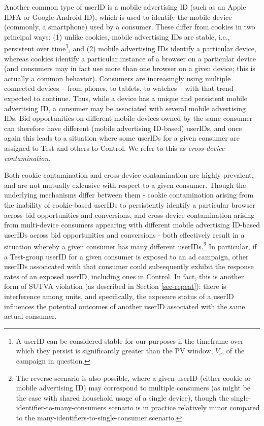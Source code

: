 \documentclass[11pt,a4paper]{article}
\theoremstyle{definition}
\theoremstyle{remark}
\theoremstyle{definition}
\theoremstyle{definition}
\theoremstyle{definition}
\theoremstyle{definition}
\theoremstyle{definition}
\theoremstyle{definition}
\begin{document}
Another common type of userID is a mobile advertising ID (such as an Apple IDFA or Google Android ID), which is used to identify the mobile device (commonly, a smartphone) used by a consumer. These differ from cookies in two principal ways: (1) unlike cookies, mobile advertising IDs are stable, i.e., persistent over time\footnote{A userID can be considered stable for our purposes if the timeframe over which they persist is significantly greater than the PV window, $V_c$, of the campaign in question.}, and (2) mobile advertising IDs identify a particular device, whereas cookies identify a particular instance of a browser on a particular device (and consumers may in fact use more than one browser on a given device; this is actually a common behavior). Consumers are increasingly using multiple connected devices -- from phones, to tablets, to watches -- with that trend expected to continue. Thus, while a device has a unique and persistent mobile advertising ID, a consumer may be associated with several mobile advertising IDs. 
Bid opportunities on different mobile devices owned by the same consumer can therefore have different (mobile advertising ID-based) userIDs, and once again this leads to a situation where some userIDs for a given consumer are assigned to Test and others to Control. We refer to this as \textit{cross-device contamination}.

Both cookie contamination and cross-device contamination are highly prevalent, and are not mutually exlcusive with respect to a given consumer. Though the underlying mechanisms differ between them - cookie contamination arising from the inability of cookie-based userIDs to persistently identify a particular browser across bid opportunities and conversions, and cross-device contamination arising from multi-device consumers appearing with different mobile advertising ID-based userIDs across bid opportunities and conversions - both effectively result in a situation whereby a given consumer has many different userIDs.\footnote{
The reverse scenario is also possible, where a given userID (either cookie or mobile advertising ID) may correspond to multiple consumers (as might be the case with shared household usage of a single device), though the single-identifier-to-many-consumers scenario is in practice relatively minor compared to the many-identifiers-to-single-consumer scenario.} In particular, if a Test-group userID for a given consumer is exposed to an ad campaign, other userIDs associcated with that consumer could subsequently exhibit the response rates of an exposed userID, including ones in Control. In fact, this is another form of SUTVA violation (as described in Section \ref{sec-repeat}): there is interference among units, and specifically, the exposure status of a userID influences the potential outcomes of another userID associated with the same actual consumer. 
\end{document}
